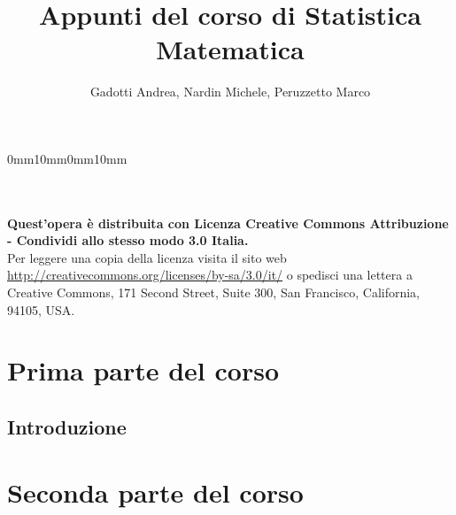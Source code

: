 \documentclass[11pt,a4paper]{report}
\title{Appunti del corso di Statistica Matematica}
\author{Gadotti Andrea, Nardin Michele, Peruzzetto Marco}
\date{}
\begin{document}
\setmarginsrb{35mm}{20mm}{25mm}{35mm}%
             {0mm}{10mm}{0mm}{10mm}
             
\maketitle

\null
\vfill
\noindent \ccbysa  \\
\\
\textbf{Quest'opera è distribuita con Licenza Creative Commons Attribuzione - Condividi allo stesso modo 3.0 Italia.} \\
Per leggere una copia della licenza visita il sito web \url{http://creativecommons.org/licenses/by-sa/3.0/it/} o spedisci una lettera a Creative Commons, 171 Second
Street, Suite 300, San Francisco, California, 94105, USA.


\newpage
{}

\tableofcontents
\chapter{Prima parte del corso}
\section{Introduzione}











\chapter{Seconda parte del corso}


\end{document}
